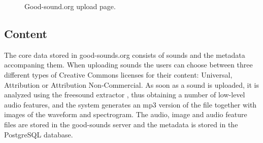 \documentclass{article}
\begin{document}
\begin{figure}
 \centerline{}
 \caption{Good-sound.org upload page.}
 \label{fig:sound_list}
\end{figure}

\subsection{Content}
The core data stored in good-sounds.org consists of sounds and the metadata accompaning them. When uploading sounds the users can choose between three different types of Creative Commons licenses for their content: Universal, Attribution or Attribution Non-Commercial. As soon as a sound is uploaded, it is analyzed using the freesound extractor \cite{02}, thus obtaining a number of low-level audio features, and the system generates an mp3 version of the file together with images of the waveform and spectrogram. The audio,  image and audio feature files are stored in the good-sounds server and the metadata is stored in the PostgreSQL database. 
\end{document}
